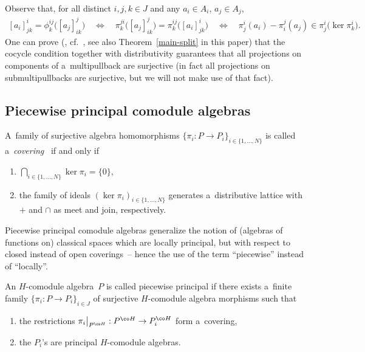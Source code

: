 Observe that, for all distinct $i,j,k\in J$ and any $a_i\in A_i$, $a_j\in A_j$,
\begin{gather}
\label{eqphi}
[a_i]^i_{jk}=\phi^{ij}_k\big([a_j]^j_{ik}\big)
\quad\!
\Leftrightarrow
\quad\!
\pi^{ji}_k\big([a_j]^j_{ik}\big)=\pi^{ij}_k\big([a_i]^{i}_{jk}\big)
\quad\!
\Leftrightarrow
\quad\!
\pi^i_j(a_i)-\pi^j_i(a_j)\in\pi^i_j\big(\ker\pi^i_k\big).\!\!\!
\end{gather}
One can prove (\cite{CM2000}, cf.~\cite{cocycle}, see also Theorem~\ref{main-split} in this paper) that the cocycle
condition together with distributivity guarantees that all projections on components of a~multipullback are surjective
(in fact all projections on submultipullbacks are surjective, but we will not make use of that fact).

\subsection{Piecewise principal comodule algebras}

\begin{definition} A~family of surjective algebra homomorphisms  $\{\pi_i:P\rightarrow P_i\}_{i\in\{1,\ldots,N\}}$
is called a~{\em covering}~\cite{hkmz11} if and only if
\begin{enumerate}\itemsep=0pt
\item[1)] $\bigcap_{i\in\{1,\ldots,N\}}\ker\pi_i=\{0\}$,
\item[2)] the family of ideals $(\ker\pi_i)_{i\in\{1,\ldots,N\}}$ generates a~distributive lattice with $+$ and $\cap$ as
meet and join, respectively.
\end{enumerate}
\end{definition}

Piecewise principal comodule algebras generalize the notion of (algebras of functions on) classical spaces which are
locally principal, but with respect to closed instead of open coverings~-- hence the use of the term ``piecewise''
instead of ``locally''.

\begin{definition}\label{piecewise-principal-def}
An $H$-comodule algebra~$P$ is called piecewise principal if there exists a~f\/inite
family $\{\pi_i:P\rightarrow P_i\}_{i\in J}$ of surjective $H$-comodule algebra morphisms such that
\begin{enumerate}\itemsep=0pt
\item[1)] the restrictions $\pi_i\big|_{P^{\co H}}:P^{\co H}\rightarrow P^{\co H}_i$ form a~covering,
\item[2)] the $P_i$'s are principal $H$-comodule algebras.
\end{enumerate}
\end{definition}

